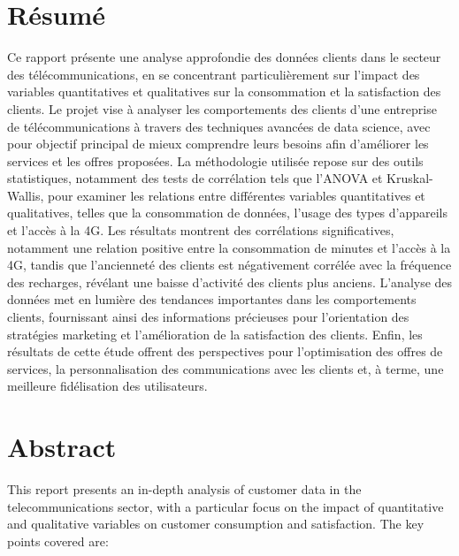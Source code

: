 \chapter*{Résumé}

\adjustmtc
\thispagestyle{MyStyle}

\justifying

\sloppy {} 

Ce rapport présente une analyse approfondie des données clients dans le secteur des télécommunications, en se concentrant particulièrement sur l'impact des variables quantitatives et qualitatives sur la consommation et la satisfaction des clients. Le projet vise à analyser les comportements des clients d'une entreprise de télécommunications à travers des techniques avancées de data science, avec pour objectif principal de mieux comprendre leurs besoins afin d'améliorer les services et les offres proposées. La méthodologie utilisée repose sur des outils statistiques, notamment des tests de corrélation tels que l'ANOVA et Kruskal-Wallis, pour examiner les relations entre différentes variables quantitatives et qualitatives, telles que la consommation de données, l'usage des types d'appareils et l'accès à la 4G. Les résultats montrent des corrélations significatives, notamment une relation positive entre la consommation de minutes et l'accès à la 4G, tandis que l'ancienneté des clients est négativement corrélée avec la fréquence des recharges, révélant une baisse d'activité des clients plus anciens. L'analyse des données met en lumière des tendances importantes dans les comportements clients, fournissant ainsi des informations précieuses pour l’orientation des stratégies marketing et l'amélioration de la satisfaction des clients. Enfin, les résultats de cette étude offrent des perspectives pour l'optimisation des offres de services, la personnalisation des communications avec les clients et, à terme, une meilleure fidélisation des utilisateurs.

\chapter*{Abstract}
This report presents an in-depth analysis of customer data in the telecommunications sector, with a particular focus on the impact of quantitative and qualitative variables on customer consumption and satisfaction. The key points covered are:

